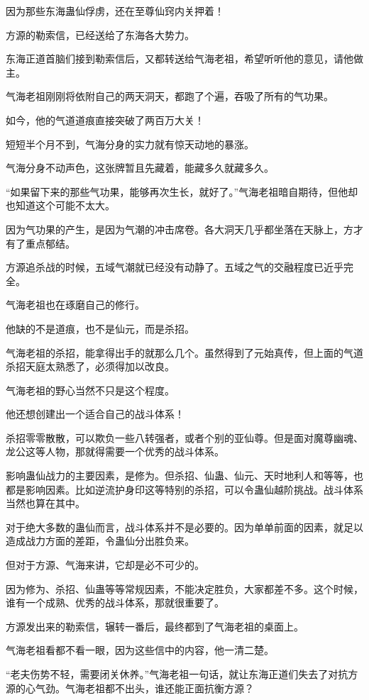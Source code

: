 \begin{this_body}
因为那些东海蛊仙俘虏，还在至尊仙窍内关押着！

方源的勒索信，已经送给了东海各大势力。

东海正道首脑们接到勒索信后，又都转送给气海老祖，希望听听他的意见，请他做主。

气海老祖刚刚将依附自己的两天洞天，都跑了个遍，吞吸了所有的气功果。

如今，他的气道道痕直接突破了两百万大关！

短短半个月不到，气海分身的实力就有惊天动地的暴涨。

气海分身不动声色，这张牌暂且先藏着，能藏多久就藏多久。

“如果留下来的那些气功果，能够再次生长，就好了。”气海老祖暗自期待，但他却也知道这个可能不太大。

因为气功果的产生，是因为气潮的冲击席卷。各大洞天几乎都坐落在天脉上，方才有了重点郁结。

方源追杀战的时候，五域气潮就已经没有动静了。五域之气的交融程度已近乎完全。

气海老祖也在琢磨自己的修行。

他缺的不是道痕，也不是仙元，而是杀招。

气海老祖的杀招，能拿得出手的就那么几个。虽然得到了元始真传，但上面的气道杀招天庭太熟悉了，必须得加以改良。

气海老祖的野心当然不只是这个程度。

他还想创建出一个适合自己的战斗体系！

杀招零零散散，可以欺负一些八转强者，或者个别的亚仙尊。但是面对魔尊幽魂、龙公这等人物，那就得需要一个优秀的战斗体系。

影响蛊仙战力的主要因素，是修为。但杀招、仙蛊、仙元、天时地利人和等等，也都是影响因素。比如逆流护身印这等特别的杀招，可以令蛊仙越阶挑战。战斗体系当然也算在其中。

对于绝大多数的蛊仙而言，战斗体系并不是必要的。因为单单前面的因素，就足以造成战力方面的差距，令蛊仙分出胜负来。

但对于方源、气海来讲，它却是必不可少的。

因为修为、杀招、仙蛊等等常规因素，不能决定胜负，大家都差不多。这个时候，谁有一个成熟、优秀的战斗体系，那就很重要了。

方源发出来的勒索信，辗转一番后，最终都到了气海老祖的桌面上。

气海老祖看都不看一眼，因为这些信中的内容，他一清二楚。

“老夫伤势不轻，需要闭关休养。”气海老祖一句话，就让东海正道们失去了对抗方源的心气劲。气海老祖都不出头，谁还能正面抗衡方源？


\end{this_body}
